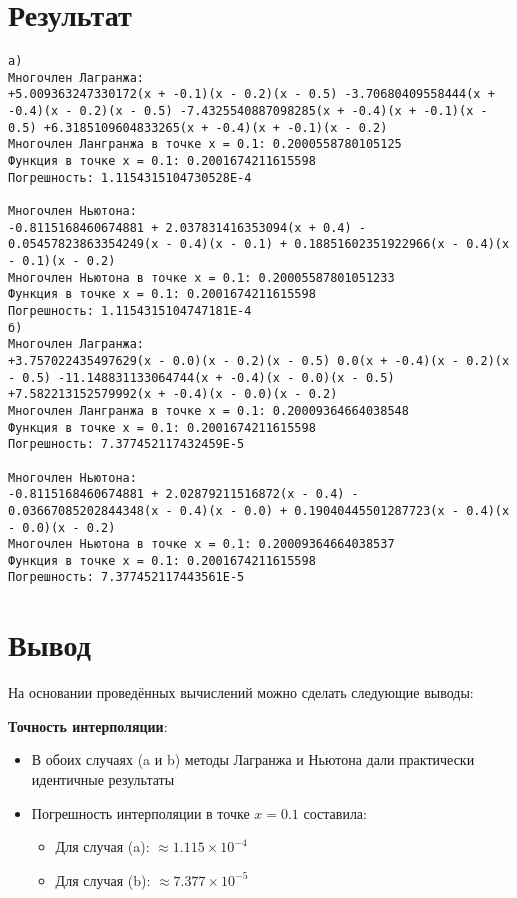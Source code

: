 \section*{Результат}

\begin{verbatim}
а)
Многочлен Лагранжа:
+5.009363247330172(x + -0.1)(x - 0.2)(x - 0.5) -3.70680409558444(x + -0.4)(x - 0.2)(x - 0.5) -7.4325540887098285(x + -0.4)(x + -0.1)(x - 0.5) +6.3185109604833265(x + -0.4)(x + -0.1)(x - 0.2) 
Многочлен Лангранжа в точке x = 0.1: 0.2000558780105125
Функция в точке x = 0.1: 0.2001674211615598
Погрешность: 1.1154315104730528E-4

Многочлен Ньютона:
-0.8115168460674881 + 2.037831416353094(x + 0.4) - 0.05457823863354249(x - 0.4)(x - 0.1) + 0.18851602351922966(x - 0.4)(x - 0.1)(x - 0.2)
Многочлен Ньютона в точке x = 0.1: 0.20005587801051233
Функция в точке x = 0.1: 0.2001674211615598
Погрешность: 1.1154315104747181E-4
б)
Многочлен Лагранжа:
+3.757022435497629(x - 0.0)(x - 0.2)(x - 0.5) 0.0(x + -0.4)(x - 0.2)(x - 0.5) -11.148831133064744(x + -0.4)(x - 0.0)(x - 0.5) +7.582213152579992(x + -0.4)(x - 0.0)(x - 0.2) 
Многочлен Лангранжа в точке x = 0.1: 0.20009364664038548
Функция в точке x = 0.1: 0.2001674211615598
Погрешность: 7.377452117432459E-5

Многочлен Ньютона:
-0.8115168460674881 + 2.02879211516872(x - 0.4) - 0.03667085202844348(x - 0.4)(x - 0.0) + 0.19040445501287723(x - 0.4)(x - 0.0)(x - 0.2)
Многочлен Ньютона в точке x = 0.1: 0.20009364664038537
Функция в точке x = 0.1: 0.2001674211615598
Погрешность: 7.377452117443561E-5
\end{verbatim}

\section*{Вывод}

На основании проведённых вычислений можно сделать следующие выводы:

\textbf{Точность интерполяции}:
\begin{itemize}
\item В обоих случаях (a и b) методы Лагранжа и Ньютона дали практически идентичные результаты
\item Погрешность интерполяции в точке $x=0.1$ составила:
\begin{itemize}
\item Для случая (a): $\approx 1.115 \times 10^{-4}$
\item Для случая (b): $\approx 7.377 \times 10^{-5}$
\end{itemize}
\end{itemize}

